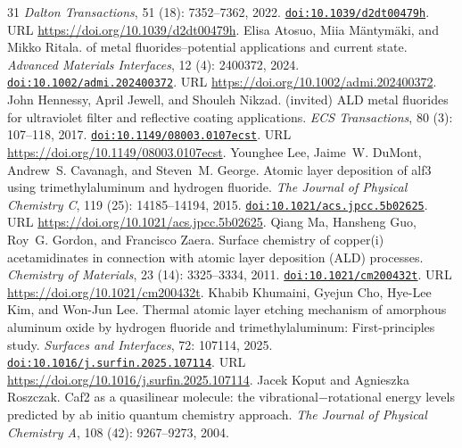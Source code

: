 \documentclass[11pt,a4paper]{article}
\theoremstyle{plain}
\theoremstyle{definition}
\theoremstyle{remark}
\providecommand{\doi}[1]{\href{https://doi.org/#1}{\texttt{doi:#1}}}
\begin{document}
\begin{thebibliography}{31}
\newblock \emph{Dalton Transactions}, 51 (18): 7352--7362,
  2022.
\newblock \doi{10.1039/d2dt00479h}.
\newblock URL \url{https://doi.org/10.1039/d2dt00479h}.
Elisa Atosuo, Miia Mäntymäki, and Mikko Ritala.
 of metal fluorides–potential applications and current state.
\newblock \emph{Advanced Materials Interfaces}, 12 (4):
  2400372, 2024.
\newblock \doi{10.1002/admi.202400372}.
\newblock URL \url{https://doi.org/10.1002/admi.202400372}.
John Hennessy, April Jewell, and Shouleh Nikzad.
\newblock (invited) {ALD} metal fluorides for ultraviolet filter and reflective
  coating applications.
\newblock \emph{ECS Transactions}, 80 (3): 107--118, 2017.
\newblock \doi{10.1149/08003.0107ecst}.
\newblock URL \url{https://doi.org/10.1149/08003.0107ecst}.
Younghee Lee, Jaime~W. DuMont, Andrew~S. Cavanagh, and Steven~M. George.
\newblock Atomic layer deposition of alf3 using trimethylaluminum and hydrogen
  fluoride.
\newblock \emph{The Journal of Physical Chemistry C}, 119
  (25): 14185--14194, 2015.
\newblock \doi{10.1021/acs.jpcc.5b02625}.
\newblock URL \url{https://doi.org/10.1021/acs.jpcc.5b02625}.
Qiang Ma, Hansheng Guo, Roy~G. Gordon, and Francisco Zaera.
\newblock Surface chemistry of copper(i) acetamidinates in connection with
  atomic layer deposition ({ALD}) processes.
\newblock \emph{Chemistry of Materials}, 23 (14): 3325--3334,
  2011.
\newblock \doi{10.1021/cm200432t}.
\newblock URL \url{https://doi.org/10.1021/cm200432t}.
Khabib Khumaini, Gyejun Cho, Hye-Lee Kim, and Won-Jun Lee.
\newblock Thermal atomic layer etching mechanism of amorphous aluminum oxide by
  hydrogen fluoride and trimethylaluminum: First-principles study.
\newblock \emph{Surfaces and Interfaces}, 72: 107114, 2025.
\newblock \doi{10.1016/j.surfin.2025.107114}.
\newblock URL \url{https://doi.org/10.1016/j.surfin.2025.107114}.
Jacek Koput and Agnieszka Roszczak.
\newblock Caf2 as a quasilinear molecule: the vibrational−rotational energy
  levels predicted by ab initio quantum chemistry approach.
\newblock \emph{The Journal of Physical Chemistry A}, 108
  (42): 9267--9273, 2004.

\end{thebibliography}
\end{document}
